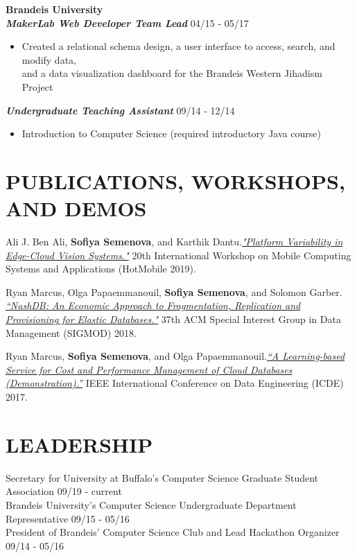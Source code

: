 \documentclass{res}
\begin{document}
\begin{resume}
\textbf{\large{Brandeis University}}
\vspace{1mm} \\
\textbf{\textit{MakerLab Web Developer Team Lead}} \hfill 04/15 - 05/17 \\
	\begin{itemize}  \itemsep -1pt %
	\item Created a relational schema design, a user interface to access, search, and modify data, \\
		and a data visualization dashboard for the Brandeis Western Jihadism Project
	\end{itemize}
\textbf{\textit{Undergraduate Teaching Assistant}} \hfill 09/14 - 12/14 \\
	\begin{itemize}  \itemsep -1pt %
	\item Introduction to Computer Science (required introductory Java course)
	\end{itemize}
\vspace{2mm}

\section{PUBLICATIONS, WORKSHOPS, AND DEMOS}
\vspace{2mm}
	Ali J. Ben Ali, \textbf{Sofiya Semenova}, and Karthik Dantu.\href{https://dl.acm.org/citation.cfm?id=3309555}{\sl"Platform Variability in Edge-Cloud Vision Systems."} 20th International Workshop on Mobile Computing Systems and Applications (HotMobile 2019).
	
	 Ryan Marcus, Olga Papaemmanouil, \textbf{Sofiya Semenova}, and Solomon Garber. \href{https://api.zotero.org/users/3604318/publications/items/35KTECTC/file/view}{\sl “NashDB: An Economic Approach to Fragmentation, Replication and Provisioning for Elastic Databases."} 37th ACM Special Interest Group in Data Management (SIGMOD) 2018.
	 
	  Ryan Marcus, \textbf{Sofiya Semenova}, and Olga Papaemmanouil.\href{http://www.cs.brandeis.edu/~olga/publications/icde17-demo.pdf}{\sl “A Learning-based Service for Cost and Performance Management of Cloud Databases (Demonstration).”} IEEE International Conference on Data Engineering (ICDE) 2017.

\section{LEADERSHIP}  
\vspace{2mm}
{Secretary for University at Buffalo's Computer Science Graduate Student Association} \hfill 09/19 - current \\
{Brandeis University's Computer Science Undergraduate Department Representative} \hfill 09/15 - 05/16 \\
{President of Brandeis' Computer Science Club and Lead Hackathon Organizer} \hfill 09/14 - 05/16 
\vspace{2mm}


\end{resume}
\end{document}
